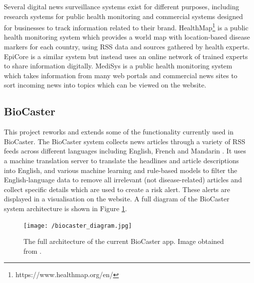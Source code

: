 \documentclass{l4proj}
\begin{document}
Several digital news surveillance systems exist for different purposes, including research systems for public health monitoring and commercial systems designed for businesses to track information related to their brand. HealthMap\footnote{https://www.healthmap.org/en/} is a public health monitoring system which provides a world map with location-based disease markers for each country, using RSS data and sources gathered by health experts. EpiCore \citep{haddad2016epicore} is a similar system but instead uses an online network of trained experts to share information digitally. MediSys \citep{steinberger2008medisys} is a public health monitoring system which takes information from many web portals and commercial news sites to sort incoming news into topics which can be viewed on the website. \par

\subsection{BioCaster}
This project reworks and extends some of the functionality currently used in BioCaster. The BioCaster system collects news articles through a variety of RSS feeds across different languages including English, French and Mandarin \citep{collier2008biocaster}. It uses a machine translation server to translate the headlines and article descriptions into English, and various machine learning and rule-based models to filter the English-language data to remove all irrelevant (not disease-related) articles and collect specific details which are used to create a risk alert. These alerts are displayed in a visualisation on the website. A full diagram of the BioCaster system architecture is shown in Figure \ref{fig:biocaster_architecture}. 
 \begin{figure}[h]
 \centering
\texttt{[image: /biocaster\_diagram.jpg]}
\caption{The full architecture of the current BioCaster app. Image obtained from \cite{meng2022biocaster}.}
\label{fig:biocaster_architecture}
\end{figure}
\par
\end{document}
